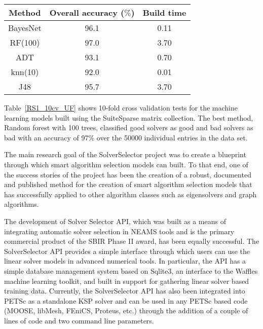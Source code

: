 \begin{table*}[h]
\centering
\caption{Convergence model accuracy and build time for 10-fold cross validation with SuiteSparse data set.}
\label{RS1_10cv_UF}
\begin{tabular}{|c|c|c|}    \hline  

Method                & Overall accuracy ($\%$)  & Build time \\ \hline\hline
BayesNet              &	96.1                    & 0.11	\\ \hline	    
RF(100)   &           97.0                    & 3.70	\\ \hline      
ADT                              &  93.1	                & 0.70	\\ \hline  
knn(10)                             &	92.0                    & 0.01	\\ \hline	    
J48                           &	95.7                    & 3.70	\\ \hline 	    
\end{tabular}
\end{table*}

Table~\ref{RS1_10cv_UF} shows 10-fold cross validation tests for the machine learning models built using the SuiteSparse matrix collection. The best method, Random forest with 100 trees, classified good solvers as good and bad solvers as bad with an accuracy of 97\% over the 50000 individual entries in the data set.

The main research goal of the SolverSelector project was to create a blueprint through which smart algorithm selection models can built. To that end, one of the success stories of the project has been the creation of a robust, documented and published method for the creation of smart algorithm selection models that has successfully applied to other algorithm classes such as eigensolvers and graph algorithms.   

The development of Solver Selector API, which was built as a means of integrating automatic solver selection in NEAMS tools and is the primary commercial product of the SBIR Phase II award, has been equally successful. The SolverSelector API provides a simple interface through which users can use the linear solver models in advanced numerical tools. In particular, the API has a simple database management system based on Sqlite3, an interface to the Waffles machine learning toolkit, and built in support for gathering linear solver based training data. Currently, the SolverSelector API has also been integrated into PETSc as a standalone KSP solver and can be used in any PETSc based code (MOOSE, libMesh, FEniCS, Proteus, etc.) through the addition of a couple of lines of code and two command line parameters.

